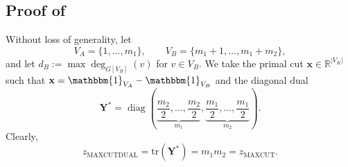 \documentclass[a4paper,fleqn]{cas-sc}
\newcommand{\R}{\mathbb{R}}
\renewcommand{\L}{\mathcal{L}}
\newcommand{\I}{\mathbf{I}}
\newcommand{\1}{\mathbf{1}}
\newcommand{\x}{\mathbf{x}}
\newcommand{\Y}{\mathbf{Y}}
\newcommand{\ind}{\mathbbm{1}}
\newcommand{\ignore}[1]{}
\begin{document}
\ignore{
\begin{proof}
  Since $ G_K,G_{A},G_{B} $  have no edges in common, we have $ \lambda_{\max}(\L_{G'}) = m_1+m_2 $. Let \( \x = (\x_A^\top, \x_B^\top)^\top \), where \( \x_A \in \{\pm 1\}^{|V_A|} \) and  $\x_B \in  \{\pm 1\}^{|V_B|}$  are the cut-sign vectors corresponding to the optimal Max-Cut partitions of \( G_A \) and \( G_B \), respectively.This gives 

    \begin{align*}
\x^\top \L_{G'} \x 
  &= \x^\top \L_{G_K} \x 
   + \x_A^\top \L_{G_{A}} \x_A 
   + \x_B^\top \L_{G_{B}} \x_B \\
  &= \frac{m_1 m_2}{2} + \frac{m_1^2}{4} + \frac{m_2^2}{4} \\
  &= \frac{(m_1+m_2)^2}{4}
\end{align*}

For constructing a dual with same objective value, take $\Y = \frac{m_1+m_2}{4} \times \I_{m_1 + m_2}$. This dual can be verified to be feasible because $\lambda_{\min}(\Y) - \frac{1}{4}\lambda_{\max}(\L_{G'}) \geq 0$. \\

Closer inspection shows that at least two distinct partitions attain the same optimal value 
\(\frac{(m_1 + m_2)^2}{4}\): flipping the sign of all entries in one block, say \(\x_A\), leaves the cut within \(G_A\) unchanged due to its balanced structure, while the complete bipartite form of \(G_K\) together with the balancedness of \(G_B\) ensures that the total cut across \(V_A\) and \(V_B\) is also preserved. Thus, $(-\x_A^{\top}, \x_B^{\top})^{\top}$  remains optimal. Any non-trivial convex combination of two distinct rank-1 optimizers is a feasible positive semidefinite matrix of higher rank that also attains the same optimal objective value, thereby demonstrating the existence of higher-rank optimal matrix.
\end{proof}
}

\subsection{Proof of }{\label{proof2}}
Without loss of generality, let 
\[
V_A=\{1,\dots,m_1\}, \qquad V_B=\{m_1+1,\dots,m_1+m_2\},
\]
and let $d_B := \max \deg_{G[V_B]} (v)$ for $v \in V_B$. We take the primal cut $\x \in \R^{|V_K|}$ such that $\x = \ind_{V_A} - \ind_{V_B}$ and the diagonal dual 
\[
\Y^* = \operatorname{diag}\!\left(\underbrace{\dfrac{m_2}{2},\dots,\dfrac{m_2}{2}}_{m_1},
\underbrace{\dfrac{m_1}{2},\dots,\dfrac{m_1}{2}}_{m_2}\right).
\]
Clearly,
\[
z_{\text{MAXCUTDUAL}} = \mathrm{tr}(\Y^*) = m_1 m_2 = z_{\text{MAXCUT}}.
\]
\end{document}

